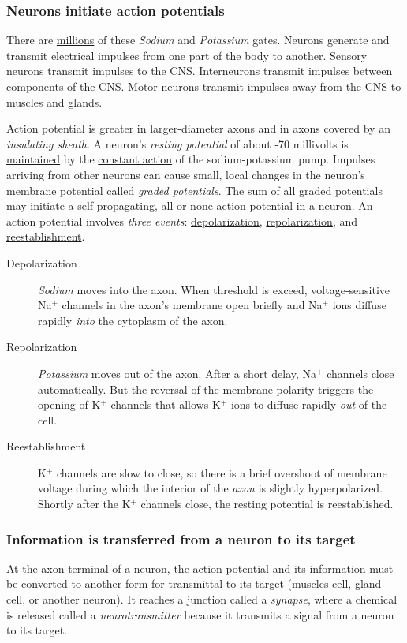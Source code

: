 \documentclass[11pt]{article}
\begin{document}
\subsubsection{Neurons initiate action potentials}
\label{sec:org1ce0237}
There are \uline{millions} of these \emph{Sodium} and \emph{Potassium} gates. Neurons generate
and transmit electrical impulses from one part of the body to another.
Sensory neurons transmit impulses to the CNS. Interneurons transmit impulses
between components of the CNS. Motor neurons transmit impulses away from the
CNS to muscles and glands.

Action potential is greater in larger-diameter axons and in axons covered by
an \emph{insulating sheath}. A neuron's \emph{resting potential} of about -70 millivolts
is \uline{maintained} by the \uline{constant action} of the sodium-potassium pump. Impulses
arriving from other neurons can cause small, local changes in the neuron's
membrane potential called \emph{graded potentials}. The sum of all graded
potentials may initiate a self-propagating, all-or-none action potential in
a neuron. An action potential involves \emph{three events}: \uline{depolarization},
\uline{repolarization}, and \uline{reestablishment}.

\begin{description}
\item[{Depolarization}] \emph{Sodium} moves into the axon. When threshold is exceed,
voltage-sensitive Na\(^{\texttt{+}}\) channels in the axon's membrane open briefly
and Na\(^{\texttt{+}}\) ions diffuse rapidly \emph{into} the cytoplasm of the axon.
\item[{Repolarization}] \emph{Potassium} moves out of the axon. After a short delay,
Na\(^{\texttt{+}}\) channels close automatically. But the reversal of the membrane
polarity triggers the opening of K\(^{\texttt{+}}\) channels that allows K\(^{\texttt{+}}\)
ions to diffuse rapidly \emph{out} of the cell.
\item[{Reestablishment}] K\(^{\texttt{+}}\) channels are slow to close, so there is a brief
overshoot of membrane voltage during which the interior of the \emph{axon} is
slightly hyperpolarized. Shortly after the K\(^{\texttt{+}}\) channels close, the
resting potential is reestablished.
\end{description}

\subsubsection{Information is transferred from a neuron to its target}
\label{sec:org4d7d169}
At the axon terminal of a neuron, the action potential and its information
must be converted to another form for transmittal to its target (muscles
cell, gland cell, or another neuron). It reaches a junction called a
\emph{synapse}, where a chemical is released called a \emph{neurotransmitter} because it
transmits a signal from a neuron to its target.
\end{document}
